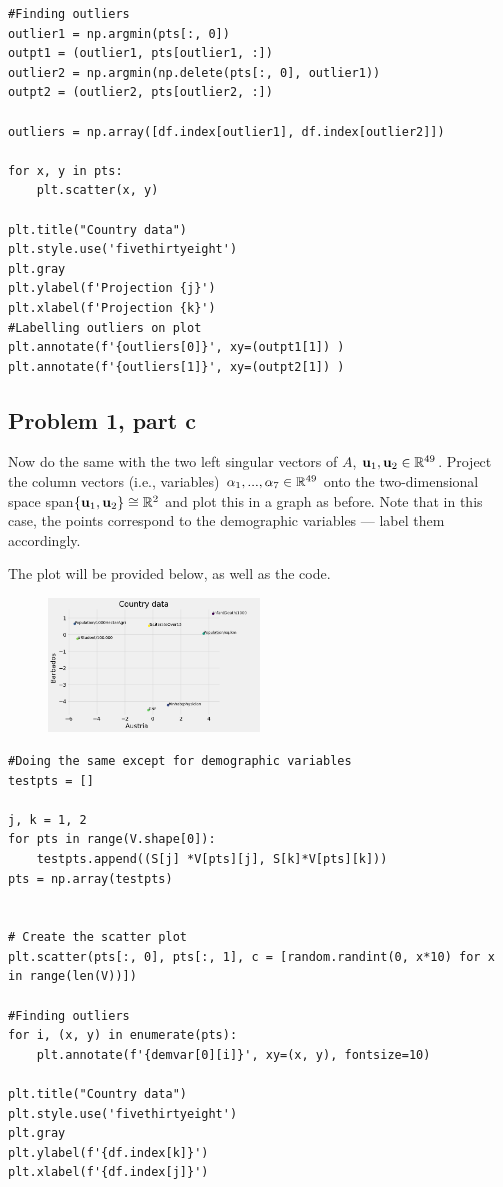 \begin{solution}
\begin{lstlisting}
#Finding outliers
outlier1 = np.argmin(pts[:, 0])
outpt1 = (outlier1, pts[outlier1, :])
outlier2 = np.argmin(np.delete(pts[:, 0], outlier1))
outpt2 = (outlier2, pts[outlier2, :])

outliers = np.array([df.index[outlier1], df.index[outlier2]])

for x, y in pts:
    plt.scatter(x, y)
    
plt.title("Country data")
plt.style.use('fivethirtyeight')
plt.gray
plt.ylabel(f'Projection {j}')
plt.xlabel(f'Projection {k}')
#Labelling outliers on plot
plt.annotate(f'{outliers[0]}', xy=(outpt1[1]) )
plt.annotate(f'{outliers[1]}', xy=(outpt2[1]) )
\end{lstlisting}
\end{solution}


\newpage
\subsection{Problem 1, part c}
Now do the same with the two left singular vectors of $A$, $\textbf{u}_1, \textbf{u}_2 \in \mathbb{R}^{49}$. Project the column vectors (i.e., variables) $\alpha_1, ..., \alpha_7 \in \mathbb{R}^{49}$ onto the two-dimensional space span$\{\textbf{u}_1, \textbf{u}_2\} \cong \mathbb{R}^2$ and plot this in a graph as before. Note that in this case, the points correspond to the demographic variables — label them accordingly.
\partbreak
\begin{solution}

The plot will be provided below, as well as the code. 

\begin{figure}[h]
    \centering
    \includegraphics[width = 0.5\textwidth]{Images/problem 1c plot.png}
    \label{fig:problem1c}
\end{figure}

\begin{lstlisting}
#Doing the same except for demographic variables
testpts = []

j, k = 1, 2
for pts in range(V.shape[0]):
    testpts.append((S[j] *V[pts][j], S[k]*V[pts][k]))
pts = np.array(testpts)


# Create the scatter plot
plt.scatter(pts[:, 0], pts[:, 1], c = [random.randint(0, x*10) for x in range(len(V))])

#Finding outliers
for i, (x, y) in enumerate(pts):
    plt.annotate(f'{demvar[0][i]}', xy=(x, y), fontsize=10)

plt.title("Country data")
plt.style.use('fivethirtyeight')
plt.gray
plt.ylabel(f'{df.index[k]}')
plt.xlabel(f'{df.index[j]}')
\end{lstlisting}
\end{solution}


